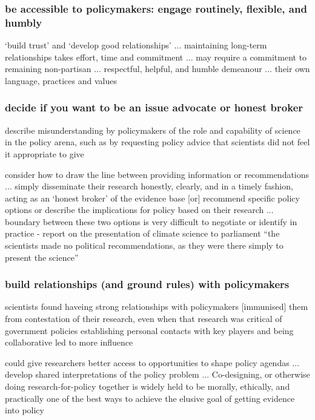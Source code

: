 \subsubsection{be accessible to policymakers: engage routinely, flexible, and humbly}
`build trust' and `develop good relationships' ... maintaining long-term relationships takes effort, time and commitment ... may require a commitment to remaining non-partisan ... respectful, helpful, and humble demeanour ... their own language, practices and values 

\subsubsection{decide if you want to be an issue advocate or honest broker}
\cite{OjanenBKP2021} describe  misunderstanding by policymakers of the role and capability of science in the policy arena, such as by requesting policy advice that scientists did not feel it appropriate to give

consider how to draw the line between providing information or recommendations ... simply disseminate their research honestly, clearly, and in a timely fashion, acting as an `honest broker' of the evidence base [or] recommend specific policy options or describe the implications for policy based on their research ... boundary between these two options is very difficult to negotiate or identify in practice
\cite{Horton2022} - report on the presentation of climate science to parliament ``the scientists made no political recommendations, as they were there simply to present the science''


\subsubsection{build relationships (and ground rules) with policymakers}
\cite{OjanenBKP2021} scientists found haveing strong relationships with policymakers [immunised] them from contestation of their research, even when that research was critical of government policies
\cite{SaxonbergSL2023} establishing personal contacts with key players and being collaborative led to more influence

could give researchers better access to opportunities to shape policy agendas ... develop shared interpretations of the policy problem ... Co-designing, or otherwise doing research-for-policy together is widely held to be morally, ethically, and practically one of the best ways to achieve the elusive goal of getting evidence into policy
